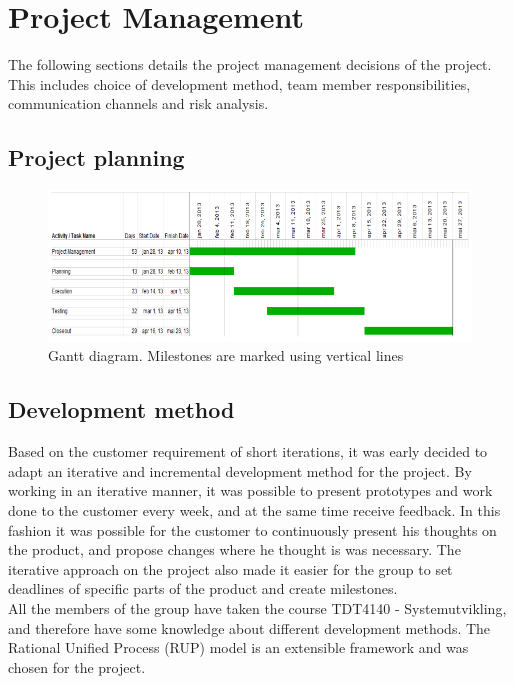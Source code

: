 \chapter{Project Management}
The following sections details the project management decisions of the project. This includes choice of development method, team member responsibilities, communication channels and risk analysis.

\section{Project planning}
\begin{figure}[H]
\includegraphics[scale=0.8]{images/gantt-diagram.png}
\caption{Gantt diagram. Milestones are marked using vertical lines}
\end{figure}

\section{Development method}
Based on the customer requirement of short iterations, it was early decided to adapt an iterative and incremental development method for the project. By working in an iterative manner, it was possible to present prototypes and work done to the customer every week, and at the same time receive feedback. In this fashion it was possible for the customer to continuously present his thoughts on the product, and propose changes where he thought is was necessary. The iterative approach on the project also made it easier for the group to set deadlines of specific parts of the product and create milestones.\\
\newline
All the members of the group have taken the course TDT4140 - Systemutvikling, and therefore have some knowledge about different development methods. The Rational Unified Process (RUP) model is an extensible framework\cite{kruchten} and was chosen for the project.

